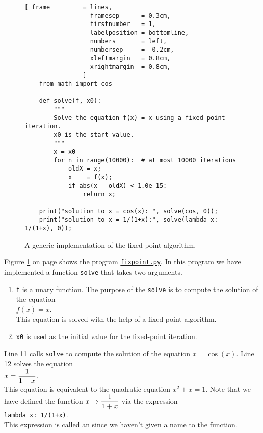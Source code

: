 \begin{figure}[!ht]
\centering
\begin{Verbatim}[ frame         = lines, 
                  framesep      = 0.3cm, 
                  firstnumber   = 1,
                  labelposition = bottomline,
                  numbers       = left,
                  numbersep     = -0.2cm,
                  xleftmargin   = 0.8cm,
                  xrightmargin  = 0.8cm,
                ]
    from math import cos
    
    def solve(f, x0):
        """
        Solve the equation f(x) = x using a fixed point iteration.
        x0 is the start value.
        """
        x = x0
        for n in range(10000):  # at most 10000 iterations
            oldX = x;
            x    = f(x);
            if abs(x - oldX) < 1.0e-15: 
                return x;
    
    print("solution to x = cos(x): ", solve(cos, 0));
    print("solution to x = 1/(1+x):", solve(lambda x: 1/(1+x), 0));
\end{Verbatim}
\vspace*{-0.3cm}
\caption{A generic implementation of the fixed-point algorithm.}
\label{fig:fixpoint.py}
\end{figure}

Figure \ref{fig:fixpoint.py} on page \pageref{fig:fixpoint.py} shows the program
\href{https://github.com/karlstroetmann/Logik/blob/master/Python/fixpoint.py}{\texttt{fixpoint.py}}.
In this program we have implemented a function \texttt{solve} that takes two arguments.
\begin{enumerate}
\item \texttt{f} is a unary function.  The purpose of the \texttt{solve} is to compute the solution of the equation
      \\[0.2cm]
      \hspace*{1.3cm}
      $f(x) = x$.
      \\[0.2cm]
      This equation is solved with the help of a fixed-point algorithm.
\item \texttt{x0} is used as the initial value for the fixed-point iteration.
\end{enumerate}
Line 11 calls \texttt{solve} to compute the solution of the equation $x = \cos(x)$.
Line 12 solves the equation 
\\[0.2cm]
\hspace*{1.3cm}
$\displaystyle x = \frac{\displaystyle1}{\displaystyle 1+x}$. 
\\[0.2cm]
This equation is equivalent to the quadratic equation $x^2 + x = 1$.  Note that we have defined the function
 $\displaystyle x \mapsto \frac{1}{1+x}$ via the expression
 \\[0.2cm]
\hspace*{1.3cm}
\texttt{lambda x: 1/(1+x)}.
\\[0.2cm]
This expression is called an  since we haven't given a name to the function.  

